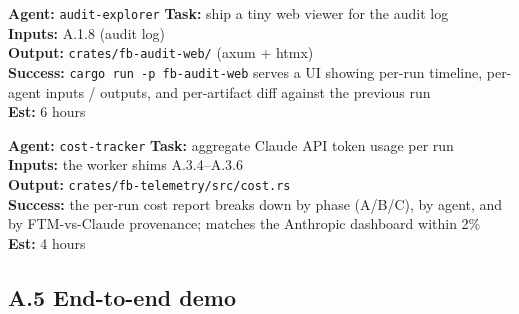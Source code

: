 \documentclass[12pt]{article}
\theoremstyle{definition}
\theoremstyle{remark}
\newenvironment{tasklist}{%
  \begingroup\raggedright
  \begin{description}[style=nextline, leftmargin=1.4cm, itemsep=0.4em]
}{%
  \end{description}
  \endgroup
}
\begin{document}
\begin{tasklist}
\item[\textbf{Task A.4.5}] \textbf{Agent:} \texttt{audit-explorer} \quad
  \textbf{Task:} ship a tiny web viewer for the audit log\\
  \textbf{Inputs:} A.1.8 (audit log)\\
  \textbf{Output:} \texttt{crates/fb-audit-web/} (axum + htmx)\\
  \textbf{Success:} \texttt{cargo run -p fb-audit-web} serves a UI
  showing per-run timeline, per-agent inputs / outputs, and
  per-artifact diff against the previous run\\
  \textbf{Est:} 6 hours

\item[\textbf{Task A.4.6}] \textbf{Agent:} \texttt{cost-tracker} \quad
  \textbf{Task:} aggregate Claude API token usage per run\\
  \textbf{Inputs:} the worker shims A.3.4--A.3.6\\
  \textbf{Output:}
  \texttt{crates/fb-telemetry/src/cost.rs}\\
  \textbf{Success:} the per-run cost report breaks down by phase
  (A/B/C), by agent, and by FTM-vs-Claude provenance; matches the
  Anthropic dashboard within 2\%\\
  \textbf{Est:} 4 hours
\end{tasklist}

\subsection*{A.5 End-to-end demo}
\end{document}
